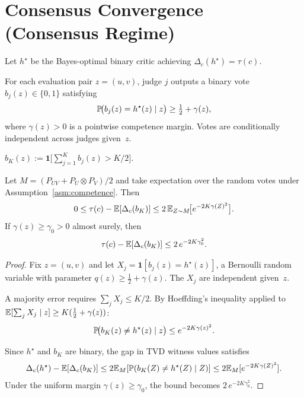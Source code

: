 \section{Consensus Convergence (Consensus Regime)}
\label{sec:consensus}

\begin{definition}
\label{def:bayes-critic}
Let $h^\star$ be the Bayes-optimal binary critic achieving $\Delta_c(h^\star) = \tau(c)$.
\end{definition}

\begin{assumption}
\label{asm:competence}
For each evaluation pair $z = (u,v)$, judge $j$ outputs a binary vote
$b_j(z) \in \{0,1\}$ satisfying
\begin{equation}
\mathbb{P}\!\big(b_j(z) = h^\star(z) \mid z\big)
\ge \tfrac{1}{2} + \gamma(z),
\end{equation}
where $\gamma(z) > 0$ is a pointwise competence margin. Votes are conditionally
independent across judges given~$z$.
\end{assumption}

\begin{definition}
$b_K(z) := \mathbf{1}\!\big[\sum_{j=1}^K b_j(z) > K/2\big].$
\end{definition}

\begin{theorem}
\label{thm:consensus}
Let $M=(P_{UV}+P_U\otimes P_V)/2$ and take expectation over the random votes under Assumption~\ref{asm:competence}. Then
\begin{equation}
0 \le \tau(c) - \mathbb{E}[\Delta_c(b_K)]
\le 2\,\mathbb{E}_{Z \sim M}\!\big[e^{-2K\gamma(Z)^2}\big].
\end{equation}
If $\gamma(z) \ge \gamma_0 > 0$ almost surely, then
\begin{equation}
\label{eq:consensus-uniform}
\tau(c) - \mathbb{E}[\Delta_c(b_K)] \le 2\,e^{-2K\gamma_0^2}.
\end{equation}
\end{theorem}

\begin{proof}
Fix $z = (u,v)$ and let $X_j = \mathbf{1}[b_j(z) = h^\star(z)]$, a Bernoulli
random variable with parameter $q(z) \ge \frac{1}{2} + \gamma(z)$.
The $X_j$ are independent given~$z$.

A majority error requires $\sum_j X_j \le K/2$. By Hoeffding's inequality
applied to $\mathbb{E}[\sum_j X_j \mid z] \ge K(\frac{1}{2} + \gamma(z))$:
\begin{equation}
\mathbb{P}\!\big(b_K(z) \neq h^\star(z) \mid z\big)
\le e^{-2K\gamma(z)^2}.
\end{equation}

Since $h^\star$ and $b_K$ are binary, the gap in TVD witness values satisfies
\begin{equation}
\Delta_c(h^\star) - \mathbb{E}[\Delta_c(b_K)]
\le 2\mathbb{E}_M[\mathbb{P}(b_K(Z) \neq h^\star(Z) \mid Z)]
\le 2\mathbb{E}_M[e^{-2K\gamma(Z)^2}].
\end{equation}
Under the uniform margin $\gamma(z) \ge \gamma_0$, the bound becomes
$2\,e^{-2K\gamma_0^2}$.
\end{proof}

